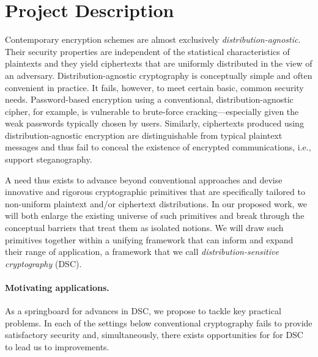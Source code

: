 \section{Project Description}
\label{sec:intro}

Contemporary encryption schemes are almost exclusively {\em
distribution-agnostic}. Their security properties are independent of the
statistical characteristics of plaintexts and they yield ciphertexts that are
uniformly distributed in the view of an adversary. Distribution-agnostic
cryptography is conceptually simple and often convenient in practice. It fails,
however, to meet certain basic, common security needs. Password-based encryption
using a conventional, distribution-agnostic cipher, for example, is vulnerable
to brute-force cracking---especially given the weak passwords typically chosen
by users. Similarly, ciphertexts produced using distribution-agnostic encryption
are distinguishable from typical plaintext messages and thus fail to conceal the
existence of encrypted communications, i.e., support steganography. 

A need thus exists to advance beyond conventional approaches and devise
innovative and rigorous cryptographic primitives that are specifically tailored
to non-uniform plaintext and/or ciphertext distributions. In our proposed work,
we will both enlarge the existing universe of such primitives and break through
the conceptual barriers that treat them as isolated notions. We will draw such
primitives together within a unifying framework that can inform and expand their
range of application, a framework that we call {\em distribution-sensitive
cryptography} (DSC). 

\paragraph{Motivating applications.} As a springboard for advances in DSC, we
propose to tackle key practical problems. In each of the settings below
conventional cryptography fails to provide satisfactory security and,
simultaneously, there exists opportunities for
for DSC to lead us to 
improvements.  %

